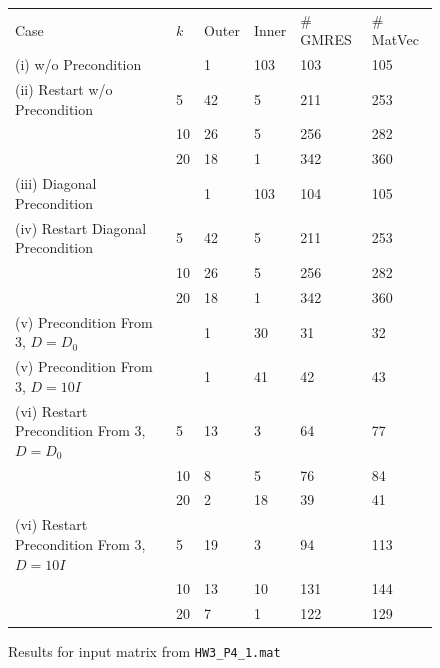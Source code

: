 \begin{enumerate}
\begin{figure}[tbh]
 \centering    
\begin{tabular}{ |p{6cm}|| p{1cm}|p{1.5cm}|p{1.5cm}|p{1.8cm}|p{1.7cm}|}
 \hline
Case & $k$ & Outer  & Inner &  \# GMRES  &\#  MatVec \\ \hhline{|=|=|=|=|=|=|}
 \hline
 (i) w/o Precondition                        &   & 1 & 103 & 103 & 105  \\
  \hline
 (ii) Restart w/o Precondition               & 5 &  42 & 5 & 211 & 253  \\                              
                                             & 10 & 26 & 5 & 256 & 282 \\
                                             & 20 & 18 & 1 & 342 & 360 \\                               
 \hline
(iii) Diagonal Precondition                  &   & 1 & 103 & 104 & 105 \\                              
 \hline
(iv) Restart Diagonal Precondition           & 5  & 42 & 5 & 211 & 253 \\                              
                                             & 10 & 26 & 5 & 256 & 282 \\
                                             & 20 & 18 & 1 & 342 & 360 \\
 \hline
(v) Precondition From 3, $D=D_{0}$           &   & 1 & 30 & 31 & 32  \\                              
 \hline
(v) Precondition From 3, $D=10I$             &   & 1 & 41 & 42 & 43 \\                              
 \hline
(vi) Restart Precondition From 3, $D=D_{0}$  & 5  & 13 & 3 & 64 & 77  \\                              
                                             & 10 & 8  & 5 & 76 & 84 \\
                                             & 20 & 2  & 18& 39 & 41 \\
\hline
(vi) Restart Precondition From 3, $D=10I$    & 5  & 19 & 3  & 94  & 113  \\                              
                                             & 10 & 13 & 10 & 131 & 144  \\
                                             & 20 & 7  & 1  & 122 & 129 \\
 \hline
\end{tabular} 
\caption{Results for input matrix from \texttt{HW3_P4_1.mat}}
   \label{tab:mat1}
\end{figure} 



\end{enumerate}
